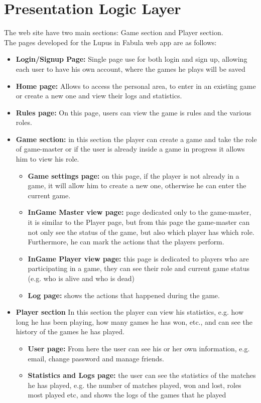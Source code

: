 \section{Presentation Logic Layer}




The web site have two main sections: Game section and Player section.\\
The pages developed for the Lupus in Fabula web app are as follows:
\begin{itemize}
    \item \textbf{Login/Signup Page:} Single page use for both login and sign up, allowing each user to have his own account, where the games he plays will be saved
    \item \textbf{Home page:} Allows to access the personal area, to enter in an existing game or create a new one and view their logs and statistics.
    \item \textbf{Rules page:} On this page, users can view the game is rules and the various roles.
    \item \textbf{Game section:} in this section the player can create a game and take the role of game-master or if the user is already inside a game in progress it allows him to view his role.
    \begin{itemize}
        \item \textbf{Game settings page:} on this page, if the player is not already in a game, it will allow him to create a new one, otherwise he can enter the current game.
        \item \textbf{InGame Master view page:} page dedicated only to the game-master, it is similar to the Player page, but from this page the game-master can not only see the status of the game, but also which player has which role. Furthermore, he can mark the actions that the players perform.
        \item \textbf{InGame Player view page:} this page is dedicated to players who are participating in a game, they can see their role and current game status (e.g. who is alive and who is dead)
        \item \textbf{Log page:} shows the actions that happened during the game.
    \end{itemize}
    \item \textbf{Player section} In this section the player can view his statistics, e.g. how long he has been playing, how many games he has won, etc., and can see the history of the games he has played.
    \begin{itemize}
        \item \textbf{User page:} From here the user can see his or her own information, e.g. email, change password and manage friends.
        \item \textbf{Statistics and Logs page:} the user can see the statistics of the matches he has played, e.g. the number of matches played, won and lost, roles most played etc, and shows the logs of the games that he played
    \end{itemize}
\end{itemize}

